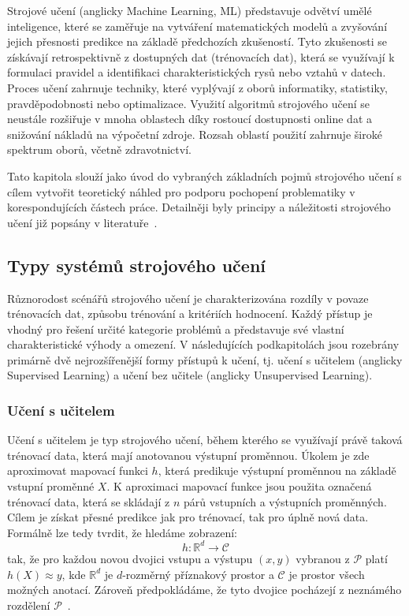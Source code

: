 Strojové učení (anglicky Machine Learning, \gls{ML}) představuje odvětví umělé
inteligence, které se zaměřuje na vytváření matematických modelů a zvyšování
jejich přesnosti predikce na základě předchozích zkušeností. Tyto zkušenosti se
získávají retrospektivně z dostupných dat (trénovacích dat), která se využívají
k formulaci pravidel a identifikaci charakteristických rysů nebo vztahů v
datech. Proces učení zahrnuje techniky, které vyplývají z  oborů informatiky,
statistiky, pravděpodobnosti nebo optimalizace. Využití algoritmů strojového
učení se neustále rozšiřuje v mnoha oblastech díky rostoucí dostupnosti online
dat a snižování nákladů na výpočetní zdroje. Rozsah oblastí použití zahrnuje
široké spektrum oborů, včetně zdravotnictví.

Tato kapitola slouží jako úvod do vybraných základních pojmů strojového učení s
cílem vytvořit teoretický náhled pro podporu pochopení problematiky v
korespondujících částech práce. Detailněji byly principy a náležitosti
strojového učení již popsány v
literatuře~\cite{Aurelien2022,Murphy2012,Goodfellow2016}.

\subsection{Typy systémů strojového učení}
Různorodost scénářů strojového učení je charakterizována rozdíly v povaze
trénovacích dat, způsobu trénování a kritériích hodnocení. Každý přístup je
vhodný pro řešení určité kategorie problémů a představuje své vlastní
charakteristické výhody a omezení. V následujících podkapitolách jsou rozebrány
primárně dvě nejrozšířenější formy přístupů k učení, tj. učení s učitelem
(anglicky Supervised Learning) a učení bez učitele (anglicky Unsupervised
Learning).

\subsubsection{Učení s učitelem}
\label{subsubsec:supervised_learning}
Učení s učitelem je typ strojového učení, během kterého se využívají právě
taková trénovací data, která mají anotovanou výstupní proměnnou. Úkolem je zde
aproximovat mapovací funkci $h$, která predikuje výstupní proměnnou na základě
vstupní proměnné $X$. K aproximaci mapovací funkce jsou použita označená
trénovací data, která se skládají z $n$ párů vstupních a výstupních proměnných.
Cílem je získat přesné predikce jak pro trénovací, tak pro úplně nová data.
Formálně lze tedy tvrdit, že hledáme zobrazení:
\begin{equation}
    h:\mathbb{R}^d \rightarrow \mathcal{C}
\end{equation}
tak, že pro každou novou dvojici vstupu a výstupu $(x,y)$ vybranou z
$\mathcal{P}$ platí $h(X) ≈ y$, kde $\mathbb{R}^d$ je $d$-rozměrný příznakový
prostor a $\mathcal{C}$ je prostor všech možných anotací. Zároveň předpokládáme,
že tyto dvojice pocházejí z neznámého rozdělení $\mathcal{P}$~\cite{Murphy2012}.

